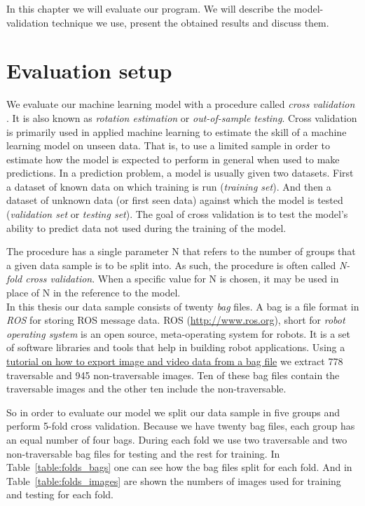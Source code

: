 \documentclass[12pt,a4paper,table,dvipsnames,tikz]{report}
\newcommand{\term}{\textit}
\newcommand{\acronym}{\MakeUppercase}
\newcommand{\bl}[1]{{\hypersetup{linkcolor=blue}#1}}
\begin{document}
	In this chapter we will evaluate our program. We will describe the model-validation 
	technique we use, present the obtained results and discuss them.
	\\
	
	\section{Evaluation setup}
	\label{sec:exp:eval}
	
	We evaluate our machine learning model with a procedure called \term{cross validation} 
	\citep{Brownlee}. It is also known as \term{rotation estimation} or \term{out-of-sample 
	testing}. Cross validation is primarily used in applied machine learning to estimate 
	the skill of a machine learning model on unseen data. That is, to use a limited sample 
	in order to estimate how the model is expected to perform in general when used to make 
	predictions. In a prediction problem, a model is usually given two datasets. First a 
	dataset of known data on which training is run (\term{training set}). And then a dataset 
	of unknown data (or first seen data) against which the model is tested (\term{validation 
	set} or \term{testing set}). The goal of cross validation is to test the model's ability 
	to predict data not used during the training of the model.
	\par
	The procedure has a single parameter N that refers to the number of groups that a given 
	data sample is to be split into. As such, the procedure is often called \term{N-fold 
	cross validation}. When a specific value for N is chosen, it may be used in place of N 
	in the reference to the model. 
	\\
	
	In this thesis our data sample consists of twenty \term{bag} files. A bag is a file 
	format in \term{\acronym{ros}} for storing \acronym{ros} message data. \acronym{ros} 
	(\url{http://www.ros.org}), short for \term{robot operating system} is an open source, 
	meta-operating system for robots. It is a set of software libraries and tools that 
	help in building robot applications. Using a 
	\href{http://wiki.ros.org/rosbag/Tutorials/Exporting%20image%20and%20video%20data}
	{tutorial on how to export image and video data from a bag file} we extract 778 
	traversable and 945 non-traversable images. Ten of these bag files contain the 
	traversable images and the other ten include the non-traversable.
	\par
	So in order to evaluate our model we split our data sample in five groups and perform 
	5-fold cross validation. Because we have twenty bag files, each group has an equal 
	number of four bags. During each fold we use two traversable and two non-traversable 
	bag files for testing and the rest for training. In Table~\bl{\ref{table:folds_bags}} one 
	can see how the bag files split for each fold. And in Table~\bl{\ref{table:folds_images}} 
	are shown the numbers of images used for training and testing for each fold.
	\\
	
\end{document}

